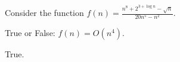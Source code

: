 \begin{prob}
    Consider the function $f(n) = \frac{n^8 + 2^{3 + \log n} - \sqrt n}{20 n^5 - n^2}$.

    True or False: $f(n) = O(n^{4})$.

    \Tf{}

    \begin{soln}
        True.
    \end{soln}
\end{prob}
